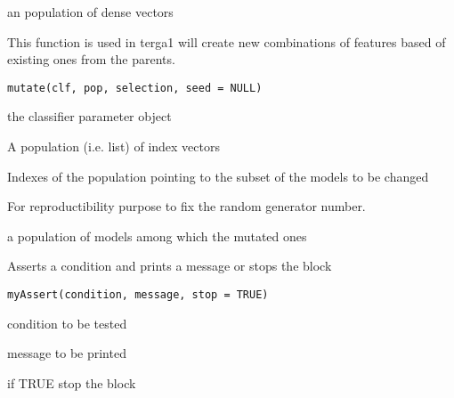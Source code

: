 \documentclass[a4paper]{book}
\begin{document}
%
\begin{Value}
an population of dense vectors
\end{Value}
%
\begin{Description}
This function is used in terga1 will create new combinations of features based of existing ones from the parents.
\end{Description}
%
\begin{Usage}
\begin{verbatim}
mutate(clf, pop, selection, seed = NULL)
\end{verbatim}
\end{Usage}
%
\begin{Arguments}
\begin{ldescription}
\item[\code{clf:}] the classifier parameter object

\item[\code{pop:}] A population (i.e. list) of index vectors

\item[\code{selection:}] Indexes of the population pointing to the subset of the models to be changed

\item[\code{seed:}] For reproductibility purpose to fix the random generator number.
\end{ldescription}
\end{Arguments}
%
\begin{Value}
a population of models among which the mutated ones
\end{Value}
%
\begin{Description}
Asserts a condition and prints a message or stops the block
\end{Description}
%
\begin{Usage}
\begin{verbatim}
myAssert(condition, message, stop = TRUE)
\end{verbatim}
\end{Usage}
%
\begin{Arguments}
\begin{ldescription}
\item[\code{condition:}] condition to be tested

\item[\code{message:}] message to be printed

\item[\code{stop:}] if TRUE stop the block
\end{ldescription}
\end{Arguments}
\end{document}
